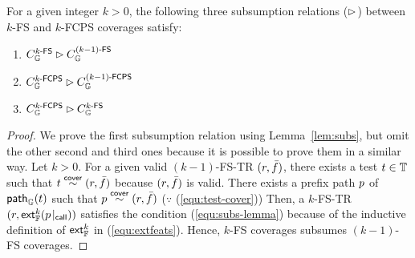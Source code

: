\begin{theorem}\label{thm:subs}
  For a given integer $k > 0$, the following three subsumption relations
  ($\rhd$) between $k$-FS and $k$-FCPS coverages satisfy:
  \begin{enumerate}
    \item $C_{\mathbb{G}}^{{k}\textsf{-FS}} \rhd C_{\mathbb{G}}^{{(k-1)}\textsf{-FS}}$
    \item $C_{\mathbb{G}}^{{k}\textsf{-FCPS}} \rhd C_{\mathbb{G}}^{{(k-1)}\textsf{-FCPS}}$
    \item $C_{\mathbb{G}}^{{k}\textsf{-FCPS}} \rhd C_{\mathbb{G}}^{{k}\textsf{-FS}}$
  \end{enumerate}
\end{theorem}

\begin{proof}
  We prove the first subsumption relation using Lemma~\ref{lem:subs}, but omit
  the other second and third ones because it is possible to prove them in a
  similar way.
  Let $k > 0$.
  For a given valid $(k-1)$-FS-TR $(r, \bar{f})$, there exists a test $t
  \in \mathbb{T}$ such that $t \overset{\textsf{cover}}{\sim} (r, \bar{f})$ because $(r, \bar{f})$
  is valid.
  There exists a prefix path $p$ of $\textsf{path}_{\mathbb{G}}(t)$ such that $p
  \overset{\textsf{cover}}{\sim} (r, \bar{f})$ ($\because$ (\ref{equ:test-cover}))
  Then, a $k$-FS-TR $(r, \textsf{ext}_{\mathbb{F}}^{k}({p}\!\mid_{\textsf{call}}))$ satisfies the condition
  (\ref{equ:subs-lemma}) because of the inductive definition of $\textsf{ext}_{\mathbb{F}}^{k}$
  in (\ref{equ:extfeats}).
  Hence, $k$-FS coverages subsumes $(k-1)$-FS coverages.
\end{proof}
